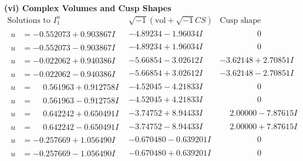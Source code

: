 \documentclass[1p]{elsarticle_modified}
\theoremstyle{definition}
\newcommand{\I}{\sqrt{-1}}
\begin{document}
\newpage\flushleft \textbf{(vi) Complex Volumes and Cusp Shapes}
$$\begin{array}{c|c|c}  
\text{Solutions to }I^u_{1}& \I (\text{vol} + \sqrt{-1}CS) & \text{Cusp shape}\\
 \hline 
\begin{aligned}
u &= -0.552073 + 0.903867 I\end{aligned}
 & -4.89234 - 1.96034 I & \phantom{-0.000000 } 0 \\ \hline\begin{aligned}
u &= -0.552073 - 0.903867 I\end{aligned}
 & -4.89234 + 1.96034 I & \phantom{-0.000000 } 0 \\ \hline\begin{aligned}
u &= -0.022062 + 0.940386 I\end{aligned}
 & -5.66854 - 3.02612 I & -3.62148 + 2.70851 I \\ \hline\begin{aligned}
u &= -0.022062 - 0.940386 I\end{aligned}
 & -5.66854 + 3.02612 I & -3.62148 - 2.70851 I \\ \hline\begin{aligned}
u &= \phantom{-}0.561963 + 0.912758 I\end{aligned}
 & -4.52045 - 4.21833 I & \phantom{-0.000000 } 0 \\ \hline\begin{aligned}
u &= \phantom{-}0.561963 - 0.912758 I\end{aligned}
 & -4.52045 + 4.21833 I & \phantom{-0.000000 } 0 \\ \hline\begin{aligned}
u &= \phantom{-}0.642242 + 0.650491 I\end{aligned}
 & -3.74752 + 8.94433 I & \phantom{-}2.00000 - 7.87615 I \\ \hline\begin{aligned}
u &= \phantom{-}0.642242 - 0.650491 I\end{aligned}
 & -3.74752 - 8.94433 I & \phantom{-}2.00000 + 7.87615 I \\ \hline\begin{aligned}
u &= -0.257669 + 1.056490 I\end{aligned}
 & -0.670480 - 0.639201 I & \phantom{-0.000000 } 0 \\ \hline\begin{aligned}
u &= -0.257669 - 1.056490 I\end{aligned}
 & -0.670480 + 0.639201 I & \phantom{-0.000000 } 0 \\ \hline\begin{aligned}

\end{aligned}
\end{array}$$
\end{document}
